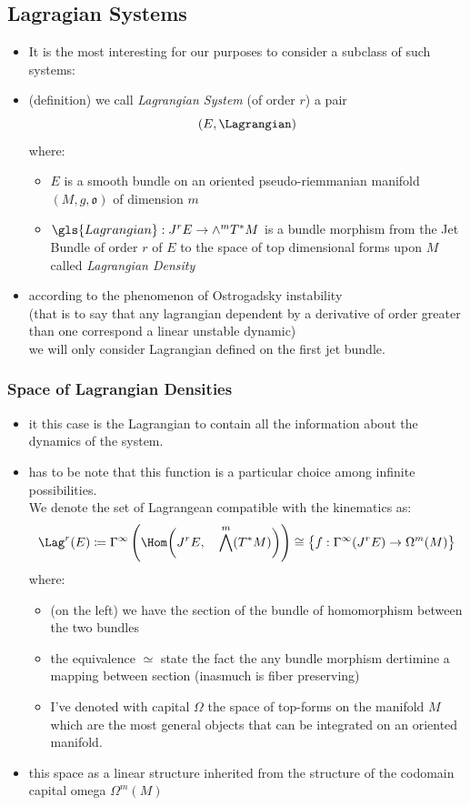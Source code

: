 \documentclass[a4paper,11pt]{scrartcl}
\begin{document}
	\subsection{Lagragian Systems}
	\begin{itemize}
		\item It is the most interesting for our purposes to consider a subclass of such systems:
		\item (definition) we call \emph{Lagrangian System} (of order $r$) a pair $$(E,\Lagrangian)$$ where:
		\begin{itemize}
			\item $E$ is a smooth bundle on an oriented pseudo-riemmanian manifold $(M,g, \mathfrak{o})$ of dimension $m$
			\item $ \gls{Lagrangian} : J^r E \rightarrow \wedge^m T^*M$ is a bundle morphism from the Jet Bundle of order $r$ of $E$ to the space of top dimensional forms upon $M$ \\
			called \emph{Lagrangian Density}
		\end{itemize}
		\item according to the phenomenon of Ostrogadsky instability\\
		(that is to say that any lagrangian dependent by a derivative of order greater than one correspond a linear unstable dynamic)\\
		we will only consider Lagrangian defined on the first jet bundle.
	\end{itemize}
	\subsubsection*{Space of Lagrangian Densities}
	\begin{itemize}
		\item it this case is the Lagrangian to contain all the information about the dynamics of the system.
		\item has to be note that this function is a particular choice among infinite possibilities.\\
		We denote the set of Lagrangean compatible with the kinematics as:
		$$ \Lag^r (E) \coloneqq \Gamma^\infty \left( \Hom\biggr(J^r E,\quad \bigwedge^m( T^*M)\biggr) \right) \cong \big\{f:\Gamma^\infty(J^r E) \rightarrow \Omega^m(M)  \big\} $$
		where:
		\begin{itemize}
			\item (on the left) we have the section of the bundle of homomorphism between the two bundles
			\item the equivalence $\simeq$ state the fact the any bundle morphism dertimine a mapping between section (inasmuch is fiber preserving)
			\item I've denoted with capital $\Omega$ the space of top-forms on the manifold $M$\\
			which are the most general objects that can be integrated on an oriented manifold.
		\end{itemize}
		\item this space as a linear structure inherited from the structure of the codomain capital omega $\Omega^m(M)$
	\end{itemize}
\end{document}
